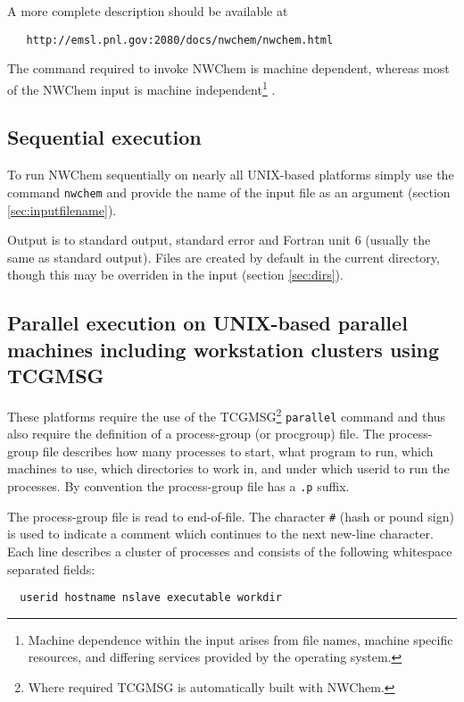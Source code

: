 A more complete description should be available at 
\begin{verbatim}
   http://emsl.pnl.gov:2080/docs/nwchem/nwchem.html
\end{verbatim}

The command required to invoke NWChem is machine dependent, whereas
most of the NWChem input is machine independent\footnote{Machine
dependence within the input arises from file names, machine
specific resources, and differing services provided by the operating system.} .

\subsection{Sequential execution}

To run NWChem sequentially on nearly all UNIX-based platforms simply
use the command \verb+nwchem+ and provide the name of the input file
as an argument (section \ref{sec:inputfilename}).  

Output is to standard output, standard error and Fortran unit 6
(usually the same as standard output).  Files are created by default
in the current directory, though this may be overriden in the input
(section \ref{sec:dirs}).

\subsection{Parallel execution on UNIX-based parallel machines
including workstation clusters using TCGMSG}
\label{sec:procgrp}

 These platforms require the use of the TCGMSG\footnote{Where required
TCGMSG is automatically built with NWChem.} \verb+parallel+ command
and thus also require the definition of a process-group (or procgroup)
file.  The process-group file describes how many processes to start,
what program to run, which machines to use, which directories to work
in, and under which userid to run the processes.  By convention the
process-group file has a \verb+.p+ suffix.

The process-group file is read to end-of-file.  The character \verb+#+
(hash or pound sign) is used to indicate a comment which continues to
the next new-line character.  Each line describes a cluster of
processes and consists of the following whitespace separated fields:

\begin{verbatim}
  userid hostname nslave executable workdir
\end{verbatim}

